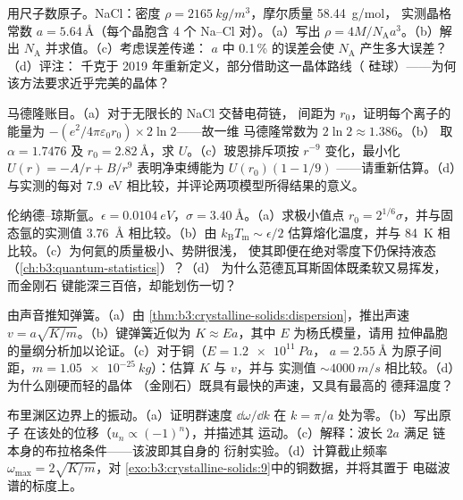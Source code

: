 \begin{exercise}[$\star\star$]\label{exo:b3:crystalline-solids:6}
用尺子数原子。NaCl：密度
$\rho = \qty{2165}{kg/m^3}$，摩尔质量 \qty{58.44}{g/mol}，
实测晶格常数 $a = \qty{5.64}{\angstrom}$（每个晶胞含 4 个 Na--Cl
对）。（a）写出 $\rho = 4M/N_{\text{A}}a^3$。（b）解出
$N_{\text{A}}$ 并求值。（c）考虑误差传递：
$a$ 中 0.1\,\% 的误差会使 $N_{\text{A}}$ 产生多大误差？（d）评注：
千克于 2019 年重新定义，部分借助这一晶体路线（
硅球）——为何该方法要求近乎完美的晶体？
\end{exercise}

\begin{exercise}[$\star\star$]\label{exo:b3:crystalline-solids:7}
马德隆账目。（a）对于无限长的 NaCl 交替电荷链，
间距为 $r_0$，证明每个离子的能量为
$-(e^2/4\pi\varepsilon_0r_0)\times2\ln2$——故一维
马德隆常数为 $2\ln2 \approx 1.386$。（b）
取 $\alpha = 1.7476$ 及 $r_0 = \qty{2.82}{\angstrom}$，求
$U$。（c）玻恩排斥项按 $r^{-9}$ 变化，最小化
$U(r) = -A/r + B/r^9$ 表明净束缚能为 $U(r_0)(1 - 1/9)$
——请重新估算。（d）与实测的每对
\qty{7.9}{eV} 相比较，并评论两项模型所得结果的意义。
\end{exercise}

\begin{exercise}[$\star\star$]\label{exo:b3:crystalline-solids:8}
伦纳德–琼斯氩。$\epsilon = \qty{0.0104}{eV}$，$\sigma =
\qty{3.40}{\angstrom}$。（a）求极小值点 $r_0 = 2^{1/6}
\sigma$，并与固态氩的实测值
\qty{3.76}{\angstrom} 相比较。（b）由
$k_{\text{B}}T_{\text{m}} \sim \epsilon/2$ 估算熔化温度，并与
\qty{84}{K} 相比较。（c）为何氦的质量极小、势阱很浅，
使其即便在绝对零度下仍保持液态（\cref{ch:b3:quantum-statistics}）？（d）
为什么范德瓦耳斯固体既柔软又易挥发，而金刚石
键能深三百倍，却能划伤一切？
\end{exercise}

\begin{exercise}[$\star\star$]\label{exo:b3:crystalline-solids:9}
由声音推知弹簧。（a）由
\cref{thm:b3:crystalline-solids:dispersion}，推出声速
$v = a\sqrt{K/m}$。（b）键弹簧近似为 $K \approx
Ea$，其中 $E$ 为杨氏模量，请用
拉伸晶胞的量纲分析加以论证。（c）对于铜（$E = \qty{1.2e11}{Pa}$，
$a = \qty{2.55}{\angstrom}$ 为原子间距，$m =
\qty{1.05e-25}{kg}$）：估算 $K$ 与 $v$，并与
实测值 $\sim\qty{4000}{m/s}$ 相比较。（d）为什么刚硬而轻的晶体
（金刚石）既具有最快的声速，又具有最高的
德拜温度？
\end{exercise}

\begin{exercise}[$\star\star\star$]\label{exo:b3:crystalline-solids:10}
布里渊区边界上的振动。（a）证明群速度
$\dd\omega/\dd k$ 在 $k = \pi/a$ 处为零。（b）写出原子
在该处的位移（$u_n \propto (-1)^n$），并描述其
运动。（c）解释：波长 $2a$ 满足
链本身的布拉格条件——该波即其自身的
衍射实验。（d）计算截止频率
$\omega_{\text{max}} = 2\sqrt{K/m}$，对
\cref{exo:b3:crystalline-solids:9}中的铜数据，并将其置于
电磁波谱的标度上。
\end{exercise}

